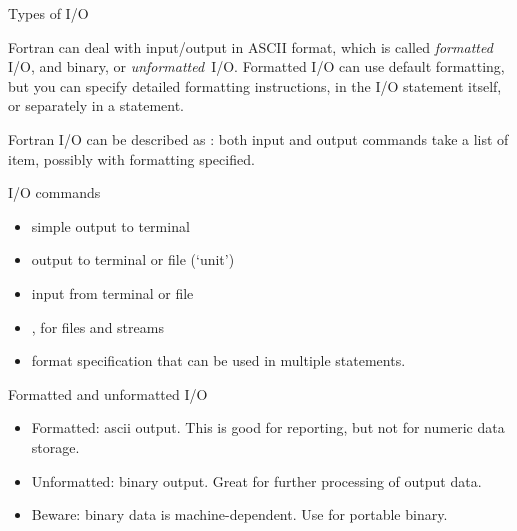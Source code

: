 
 {Types of I/O}

Fortran can deal with input/output in ASCII format, which is called
\emph{formatted} I/O, and binary, or
\emph{unformatted}~I/O.  Formatted I/O can use
default formatting, but you can specify detailed formatting
instructions, in the I/O statement itself, or separately in a
 statement.

Fortran I/O can be described as :
both input and output commands take a list of item, possibly with
formatting specified.

\begin{block}{I/O commands}
  \label{sl:fio-commands}
  \begin{itemize}
  \item {} simple output to terminal
  \item {} output to terminal or file (`unit')
  \item {} input from terminal or file
  \item {},  for files and
    streams
  \item {} format specification that can be used
    in multiple statements.
  \end{itemize}
\end{block}

\begin{block}{Formatted and unformatted I/O}
  \label{sl:fio-types}
  \begin{itemize}
  \item Formatted: ascii output. This is good for reporting, but not
    for numeric data storage.
  \item Unformatted: binary output. Great for further processing of
    output data.
  \item Beware: binary data is machine-dependent. Use 
    for portable binary.
  \end{itemize}
\end{block}

